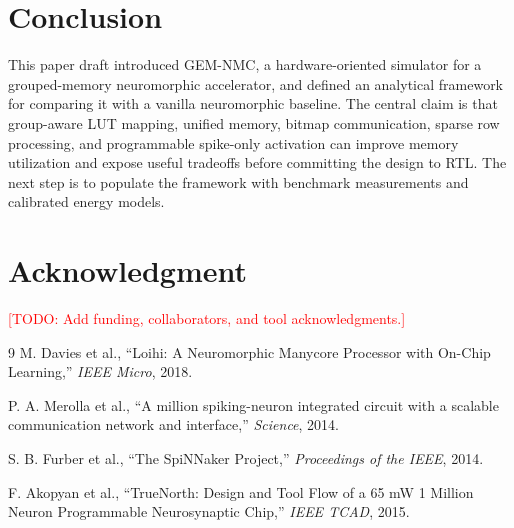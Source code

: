 \documentclass[10pt,conference]{IEEEtran}
\newcommand{\arch}{GEM-NMC}
\newcommand{\todo}[1]{\textcolor{red}{[TODO: #1]}}
\begin{document}
\section{Conclusion}
This paper draft introduced \arch{}, a hardware-oriented simulator for a grouped-memory neuromorphic accelerator, and defined an analytical framework for comparing it with a vanilla neuromorphic baseline. The central claim is that group-aware LUT mapping, unified memory, bitmap communication, sparse row processing, and programmable spike-only activation can improve memory utilization and expose useful tradeoffs before committing the design to RTL. The next step is to populate the framework with benchmark measurements and calibrated energy models.

\section*{Acknowledgment}
\todo{Add funding, collaborators, and tool acknowledgments.}

\begin{thebibliography}{9}
M. Davies et al., ``Loihi: A Neuromorphic Manycore Processor with On-Chip Learning,'' \emph{IEEE Micro}, 2018.

P. A. Merolla et al., ``A million spiking-neuron integrated circuit with a scalable communication network and interface,'' \emph{Science}, 2014.

S. B. Furber et al., ``The SpiNNaker Project,'' \emph{Proceedings of the IEEE}, 2014.

F. Akopyan et al., ``TrueNorth: Design and Tool Flow of a 65 mW 1 Million Neuron Programmable Neurosynaptic Chip,'' \emph{IEEE TCAD}, 2015.
\end{thebibliography}
\end{document}
